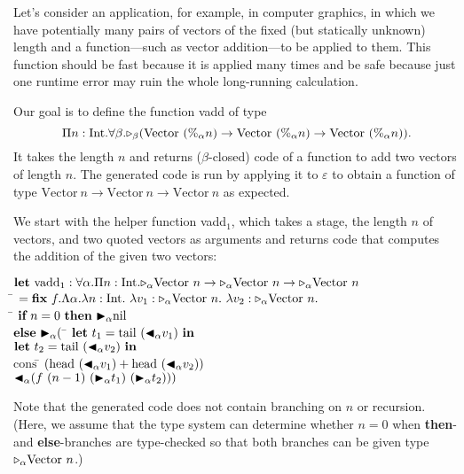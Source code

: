 Let's consider an application, for example, in computer graphics, in which we
have potentially many pairs of vectors of the fixed (but statically unknown)
length and a function---such as vector addition---to be applied to
them. This function should be fast because it is applied many times and be
safe because just one runtime error may ruin the whole long-running calculation.

\newcommand{\Vpn}{\text{Vector}\ (\%_\alpha n)}

Our goal is to define the function vadd of type
\[
  \Pi n:\I.\F\beta.\TW_\beta(\Vpn\to\Vpn\to\Vpn).
\]
\renewcommand{\Vpn}{\text{Vector}\ n}
It takes the length $n$ and returns ($\beta$-closed) code of a
function to add two vectors of length $n$.  The generated
code is run by applying it to \(\varepsilon\) to obtain
a function of type \(\Vpn\to\Vpn\to\Vpn\) as expected.

We start with the helper function vadd$_1$, which takes a stage, the length $n$
of vectors, and two quoted vectors as arguments and returns code that computes
the addition of the given two vectors:
\begin{tabbing}
	  $\textbf{let}\ \text{vadd}_1 : \F\alpha.\Pi n:\I.\TW_\alpha\Vpn\to\TW_\alpha\Vpn\to\TW_\alpha\Vpn$                                \\
	  \hspace{6mm} \= $= \textbf{fix}\ f.\Lambda\alpha.\lambda n:\I.\ \lambda v_1:\TW_\alpha\Vpn.\ \lambda v_2:\TW_\alpha\Vpn.$            \\
	  \> \hspace{6mm} \= $\textbf{if}\ n = 0 \ \textbf{then}\ {\mathop{\blacktriangleright}}_\alpha \text{nil}$ \\
	  \>\> $\textbf{else}\ {\mathop{\blacktriangleright}}_\alpha ($ \= $\textbf{let}\ t_1 = \text{tail}\ ({\mathop{\blacktriangleleft}}_\alpha v_1)\ \textbf{in}$ \\
	  \>\>\> $\textbf{let}\ t_2 = \text{tail}\ ({\mathop{\blacktriangleleft}}_\alpha v_2)\ \textbf{in}$ \\
          \>\>\> $\text{cons}\ $\= $(\text{head}\ ({\mathop{\blacktriangleleft}}_\alpha v_1) + \text{head} \ ({\mathop{\blacktriangleleft}}_\alpha v_2))$ \\
          \>\>\>\> ${\mathop{\blacktriangleleft}}_\alpha (f\ (n-1)\ ({\mathop{\blacktriangleright}}_\alpha t_1)\ ({\mathop{\blacktriangleright}}_\alpha t_2)))$
\end{tabbing}
Note that the generated code does not contain branching on $n$ or recursion.
(Here, we assume that the type system can determine whether $n=0$ when
\textbf{then}- and \textbf{else}-branches are type-checked so that both
branches can be given type \({\mathop{\triangleright}}_\alpha \text{Vector }n\).)

